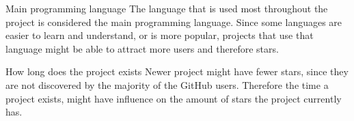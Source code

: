 \begin{LaTeXdescription}
        \item[Main programming language]
        The language that is used most throughout the project is considered the main programming language. 
        Since some languages are easier to learn and understand, or is more popular, projects that use that language might be able to attract more users and therefore stars.\cite{codementor-2015}
        \item[How long does the project exists]
        Newer project might have fewer stars, since they are not discovered by the majority of the GitHub users. 
        Therefore the time a project exists, might have influence on the amount of stars the project currently has.
    \end{LaTeXdescription}


